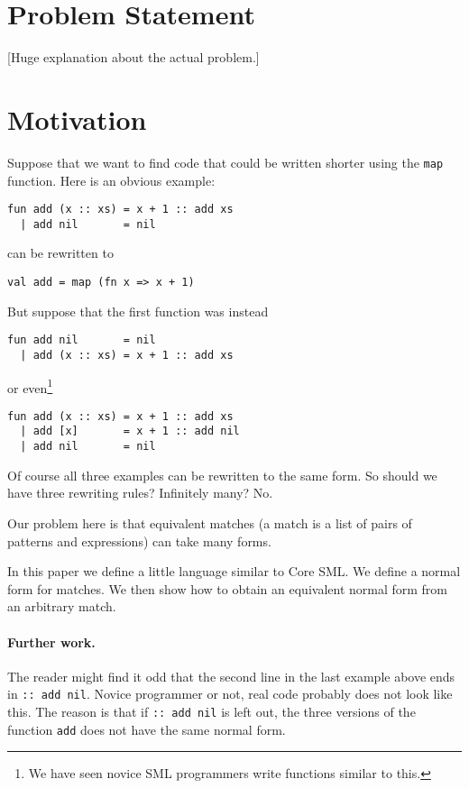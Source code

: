 
\section{Problem Statement}

{\footnotesize [Huge explanation about the actual problem.]}

\section{Motivation}
\label{sec:motivation}
Suppose that we want to find code that could be written shorter using the
\texttt{map} function.
Here is an obvious example:
\begin{lstlisting}
fun add (x :: xs) = x + 1 :: add xs
  | add nil       = nil
\end{lstlisting}
can be rewritten to
\begin{lstlisting}
val add = map (fn x => x + 1)
\end{lstlisting}

But suppose that the first function was instead
\begin{lstlisting}
fun add nil       = nil
  | add (x :: xs) = x + 1 :: add xs
\end{lstlisting}
or even\footnote{We have seen novice SML programmers write functions similar to
  this.}
\begin{lstlisting}
fun add (x :: xs) = x + 1 :: add xs
  | add [x]       = x + 1 :: add nil
  | add nil       = nil
\end{lstlisting}
Of course all three examples can be rewritten to the same form. So should we
have three rewriting rules? Infinitely many? No.

Our problem here is that equivalent matches (a match is a list of pairs of
patterns and expressions) can take many forms.

In this paper we define a little language similar to Core SML. We define a
normal form for matches. We then show how to obtain an equivalent normal form
from an arbitrary match.

\paragraph{Further work.}
The reader might find it odd that the second line in the last example above ends
in \texttt{:: add nil}. Novice programmer or not, real code probably does not
look like this. The reason is that if \texttt{:: add nil} is left out, the three
versions of the function \texttt{add} does not have the same normal form.

